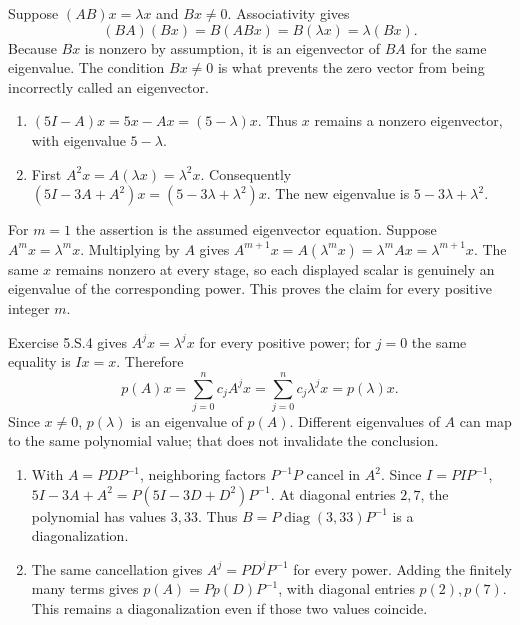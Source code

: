 Suppose $(AB)x=\lambda x$ and $Bx\ne0$. Associativity gives
\[(BA)(Bx)=B(ABx)=B(\lambda x)=\lambda(Bx).\]
Because $Bx$ is nonzero by assumption, it is an eigenvector of
$BA$ for the same eigenvalue. The condition $Bx\ne0$ is what
prevents the zero vector from being incorrectly called an eigenvector.

\begin{enumerate}[label=(\alph*)]
\item $(5I-A)x=5x-Ax=(5-\lambda)x$. Thus $x$ remains a
nonzero eigenvector, with eigenvalue $5-\lambda$.
\item First $A^2x=A(\lambda x)=\lambda^2x$. Consequently
$(5I-3A+A^2)x=(5-3\lambda+\lambda^2)x$.
The new eigenvalue is $5-3\lambda+\lambda^2$.
\end{enumerate}

For $m=1$ the assertion is the assumed eigenvector equation.
Suppose $A^mx=\lambda^mx$. Multiplying by $A$ gives
$A^{m+1}x=A(\lambda^mx)=\lambda^mAx=\lambda^{m+1}x$.
The same $x$ remains nonzero at every stage, so each displayed
scalar is genuinely an eigenvalue of the corresponding power.
This proves the claim for every positive integer $m$.

Exercise 5.S.4 gives $A^jx=\lambda^jx$ for every positive power;
for $j=0$ the same equality is $Ix=x$. Therefore
\[p(A)x=\sum_{j=0}^n c_jA^jx
=\sum_{j=0}^n c_j\lambda^jx=p(\lambda)x.\]
Since $x\ne0$, $p(\lambda)$ is an eigenvalue of $p(A)$.
Different eigenvalues of $A$ can map to the same polynomial value;
that does not invalidate the conclusion.

\begin{enumerate}[label=(\alph*)]
\item With $A=PDP^{-1}$, neighboring factors $P^{-1}P$ cancel
in $A^2$. Since $I=PIP^{-1}$,
$5I-3A+A^2=P(5I-3D+D^2)P^{-1}$.
At diagonal entries $2,7$, the polynomial has values $3,33$.
Thus $B=P\operatorname{diag}(3,33)P^{-1}$ is a diagonalization.
\item The same cancellation gives $A^j=PD^jP^{-1}$ for every
power. Adding the finitely many terms gives
$p(A)=Pp(D)P^{-1}$, with diagonal entries $p(2),p(7)$.
This remains a diagonalization even if those two values coincide.
\end{enumerate}

